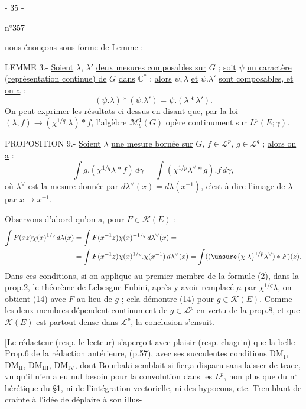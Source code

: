 \begin{center}- 35 -\end{center}
\begin{flushright}n°357\end{flushright}
nous énonçons sous forme de Lemme :

LEMME 3.- \uline{Soient} $\lambda$, $\lambda'$ \uline{deux mesures composables sur} $G$ ; \uline{soit} $\psi$ \uline{un caractère (représentation continue) de} $G$ \uline{dans} $\mathbb C^*$ ; \uline{alors} $\psi,\lambda$ \uline{et} $\psi.\lambda'$ \uline{sont composables, et on a} :
\[
(\psi.\lambda)*(\psi.\lambda')=\psi.(\lambda*\lambda').
\]
On peut exprimer les résultats ci-dessus en disant que, par la loi $(\lambda,f)\to(\chi^{1/q}.\lambda)*f$, l'algèbre $\mathcal M_b^1(G)$ opère continument sur $L^p(E;\gamma)$.

PROPOSITION 9.- \uline{Soient} $\lambda$ \uline{une mesure bornée sur} $G$, $f\in\mathcal L^p$, $g\in\mathcal L^q$ ; \uline{alors on a} :
\[
\tag{14}
\int g.(\chi^{1/q}\lambda*f)\,d\gamma
=\int(\chi^{1/p}\lambda^\vee*g).f\,d\gamma,
\]
\uline{où} $\lambda^\vee$ \uline{est la mesure donnée par} $d\lambda^\vee(x)=d\lambda(x^{-1})$, \uline{c'est-à-dire l'image de} $\lambda$ \uline{par} $x\to x^{-1}$.

Observons d'abord qu'on a, pour $F\in\mathcal K(E)$ :
\[
\begin{aligned}
\int F(xz)\chi(x)^{1/q}\,d\lambda(x)
&=\int F(x^{-1}z)\chi(x)^{-1/q}\,d\lambda^\vee(x)=\\
&=\int F(x^{-1}z)\chi(x)^{1/p}.\chi(x^{-1})\,d\lambda^\vee(x)
=\int((\unsure{\chi|\lambda}^{1/p}\lambda^\vee)*F)(z).
\end{aligned}
\]
Dans ces conditions, si on applique au premier membre de la formule (2), dans la prop.2, le théorème de Lebesgue-Fubini, après y avoir remplacé $\mu$ par $\chi^{1/q}\lambda$, on obtient (14) avec $F$ au lieu de $g$ ; cela démontre (14) pour $g\in\mathcal K(E)$. Comme les deux membres dépendent continument de $g\in\mathcal L^p$ en vertu de la prop.8, et que $\mathcal K(E)$ est partout dense dans $\mathcal L^p$, la conclusion s'ensuit.

[Le rédacteur (resp. le lecteur) s'aperçoit avec plaisir (resp. chagrin) que la belle Prop.6 de la rédaction antérieure, (p.57), avec ses succulentes conditions $\mathrm{DM}_{\mathrm I}$, $\mathrm{DM}_{\mathrm {II}}$, $\mathrm{DM}_{\mathrm {III}}$, $\mathrm{DM}_{\mathrm {IV}}$, dont Bourbaki semblait si fier,a disparu sans laisser de trace, vu qu'il n'en a eu nul besoin pour la convolution dans les $L^p$, non plus que du n° hérétique du §1, ni de l'intégration vectorielle, ni des hypocons, etc. Tremblant de crainte à l'idée de déplaire à son illus-

